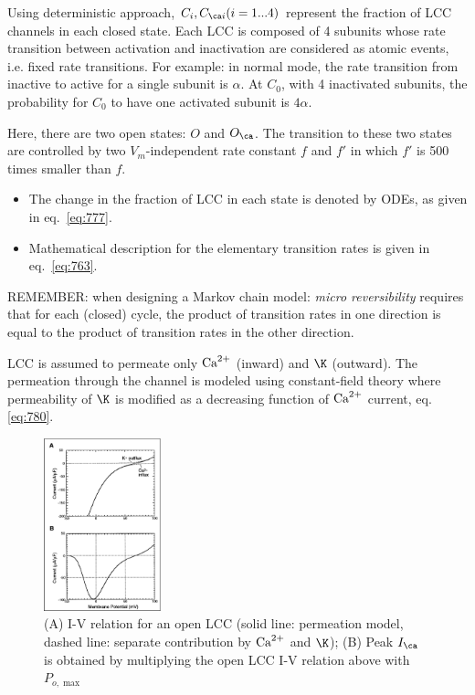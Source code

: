 Using deterministic approach, $C_i, C_{\ca i} (i=1...4)$ represent the fraction
of LCC channels in each closed state. Each LCC is composed of 4 subunits whose rate
transition between activation and inactivation are considered as
atomic events, i.e. fixed rate transitions. For example: in normal
mode, the rate transition from inactive to active for a single subunit
is $\alpha$. At $C_0$, with 4 inactivated subunits, the probability
for $C_0$ to have one activated subunit is $4\alpha$.

Here, there are two open states: $O$ and $O_\ca $. The transition to
these two states are controlled by two $V_m$-independent rate constant
$f$ and $f'$ in which $f'$ is 500 times smaller than $f$.  
\begin{itemize}
\item The change in the fraction of LCC in each state is denoted by
  ODEs, as given in eq.~\eqref{eq:777}.

\item Mathematical description for the elementary transition rates is
  given in eq.~\eqref{eq:763}.
\end{itemize}

\begin{framed}
  REMEMBER: when designing a Markov chain model:
  {\it micro reversibility} requires that for each (closed) cycle, the
  product of transition rates in one direction is equal to the product
  of transition rates in the other direction.
\end{framed}

LCC is assumed to permeate only ${\text{Ca}^{2+}}$ (inward) and $\K$ (outward). The
permeation through the channel is modeled using constant-field theory where
permeability of $\K$ is modified as a decreasing function of ${\text{Ca}^{2+}}$ current,
eq.\ref{eq:780}.

\begin{figure}[hbt]
  \centerline{\includegraphics[height=5cm,
    angle=0]{./images/Jafri_98_LCC-current.eps}}
  \caption{(A) I-V relation for an open LCC (solid line: permeation model,
  dashed line: separate contribution by ${\text{Ca}^{2+}}$ and $\K$); (B) Peak $I_\ca$ is
  obtained by multiplying the open LCC I-V relation above with $P_{o,\max}$}
  \label{fig:Jafri98_LCCcurrent}
\end{figure}


